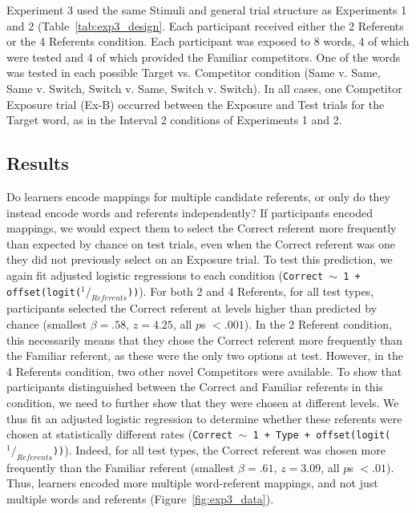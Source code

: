\documentclass[man,floatsintext]{apa6}
\begin{document}
Experiment 3 used the same Stimuli and general trial structure as Experiments 1 and 2 (Table~\ref{tab:exp3_design}. Each participant received either the 2 Referents or the 4 Referents condition. Each participant was exposed to 8 words, 4 of which were tested and 4 of which provided the Familiar competitors. One of the words was tested in each possible Target vs. Competitor condition (Same v. Same, Same v. Switch, Switch v. Same, Switch v. Switch). In all cases, one Competitor Exposure trial (Ex-B) occurred between the Exposure and Test trials for the Target word, as in the Interval 2 conditions of Experiments 1 and 2. 

\subsection{Results}

Do learners encode mappings for multiple candidate referents, or only do they instead encode words and referents independently? If participants encoded mappings, we would expect them to select the Correct referent more frequently than expected by chance on test trials, even when the Correct referent was one they did not previously select on an Exposure trial. To test this prediction, we again fit adjusted logistic regressions to each condition (\small{\tt{Correct $\sim$ 1 + offset(logit($^1/_{Referents}$))}}). For both 2 and 4 Referents, for all test types, participants selected the Correct referent at levels higher than predicted by chance (smallest $\beta =  .58$, $z=4.25$, all $p$s $< .001$). In the 2 Referent condition, this necessarily means that they chose the Correct referent more frequently than the Familiar referent, as these were the only two options at test. However, in the 4 Referents condition, two other novel Competitors were available. To show that participants distinguished between the Correct and Familiar referents in this condition, we need to further show that they were chosen at different levels. We thus fit an adjusted logistic regression to determine whether these referents were chosen at statistically different rates (\small{\tt{Correct $\sim$ 1 + Type + offset(logit($^1/_{Referents}$))}}). Indeed, for all test types, the Correct referent was chosen more frequently than the Familiar referent (smallest $\beta =  .61$, $z=3.09$, all $p$s $< .01$). Thus, learners encoded more multiple word-referent mappings, and not just multiple words and referents (Figure~\ref{fig:exp3_data}).
\end{document}
